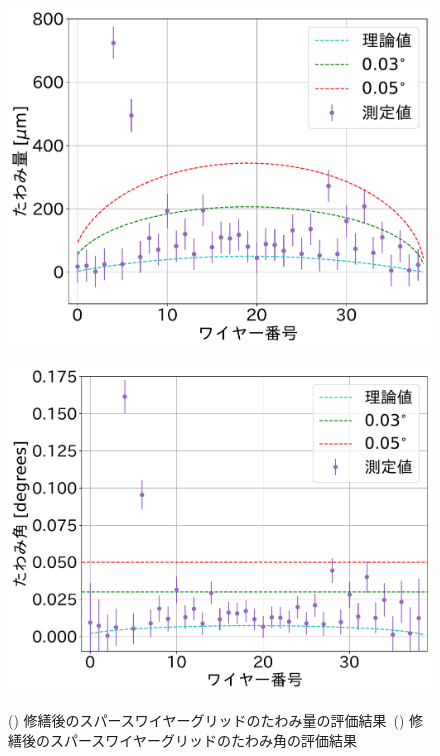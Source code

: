 \documentclass[../../main.tex]{subfiles}
\begin{document}
\begin{figure}[H]
    \begin{minipage}[b]{0.5\hsize}
        \centering
        \includegraphics[width=1.0\textwidth]{wiresag_swg/swg_sag_after.pdf}
        \subcaption{}
        \label{fig:wiresag_swg_sag_result_repair}
    \end{minipage}
    \begin{minipage}[b]{0.5\hsize}
        \centering
        \includegraphics[width=1.0\textwidth]{wiresag_swg/swg_sag_angle_after.pdf}
        \subcaption{}
        \label{fig:wiresag_swg_sag_angle_result_repair}
    \end{minipage}
    \caption{() 修繕後のスパースワイヤーグリッドのたわみ量の評価結果\ 
             () 修繕後のスパースワイヤーグリッドのたわみ角の評価結果}
    \label{fig:wiresag_swg_result_repair}
\end{figure}
\end{document}

